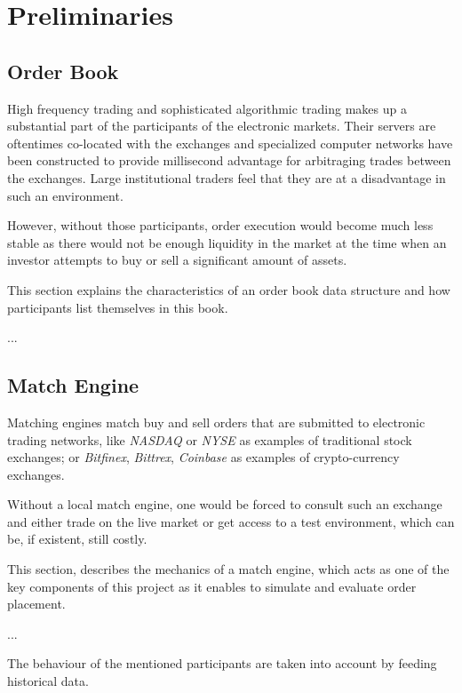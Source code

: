 \chapter{Preliminaries}
\label{chap:preliminaries}

\section{Order Book}

High frequency trading and sophisticated algorithmic trading makes up a substantial part of the participants of the electronic markets. 
Their servers are oftentimes co-located with the exchanges and specialized computer networks have been constructed to provide millisecond advantage for arbitraging trades between the exchanges. 
Large institutional traders feel that they are at a disadvantage in such an environment. \cite{patterson2012dark}

However, without those participants, order execution would become much less stable as there would not be enough liquidity in the market at the time when an investor attempts to buy or sell a significant amount of assets.

This section explains the characteristics of an order book data structure and how participants list themselves in this book.

...

\section{Match Engine}
\label{sec:match-engine}

Matching engines match buy and sell orders that are submitted to electronic trading networks, like \textit{NASDAQ} or \textit{NYSE} as examples of traditional stock exchanges; or \textit{Bitfinex}, \textit{Bittrex}, \textit{Coinbase} as examples of crypto-currency exchanges.

Without a local match engine, one would be forced to consult such an exchange and either trade on the live market or get access to a test environment, which can be, if existent, still costly. 

This section, describes the mechanics of a match engine, which acts as one of the key components of this project as it enables to simulate and evaluate order placement.

...

The behaviour of the mentioned participants are taken into account by feeding historical data.


